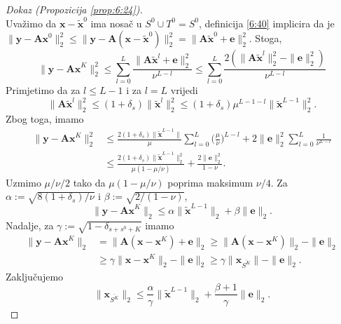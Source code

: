 \documentclass[a4paper,twoside,12pt]{memoir} %
\newcommand{\vect}[1]{\mathbf{#1}}
\renewcommand{\vec}{\vect}
\newcommand{\norm}[1]{\|{#1}\|}
\begin{document}
\begin{proof}[Dokaz (Propozicija \ref{prop:6:24})]
\begin{equation*}
    \end{equation*}
    \newpage
    \noindent
    Uva\v{z}imo da $\vec x - \tilde{\vec x}^0$ ima nosa\v{c} u $S^0 \cup T^0 = S^0$, definicija \eqref{6:40} implicira da je $\norm{\vec y - \vec {Ax}^0}_2^2 \leq \norm{\vec y - \vec A(\vec x - \tilde{\vec x}^0)}_2^2 = \norm{\vec A \tilde{\vec x}^0 + \vec e}_2^2$. Stoga,
    \begin{equation*}
        \norm{\vec y - \vec {Ax}^K}_2^2 \leq \sum_{l=0}^L \frac{\norm{\vec A \tilde{\vec x}^l + \vec e}_2^2}{\nu^{L-l}} \leq \sum_{l=0}^L \frac{2(\norm{\vec A \tilde{\vec x}^l}_2^2 - \norm{\vec e}_2^2)}{\nu^{L-l}}  
    \end{equation*}
    Primjetimo da za $l \leq L - 1$ i za $l = L$ vrijedi
    \begin{equation*}
        \norm{\vec A \tilde{\vec x}^l}_2^2 \leq (1+\delta_s)\norm{\tilde{\vec x}^l}_2^2 \leq (1+\delta_s)\mu^{L-1-l} \norm{\tilde{\vec x}^{L-1}}_2^2.
    \end{equation*}
    Zbog toga, imamo
    \begin{align*}
        \norm{\vec y - \vec{Ax}^K}_2^2 & \leq \frac{2(1+\delta_s)\norm{\tilde{\vec x}^{L-1}}}{\mu}\sum_{l=0}^L \bigg( \frac{\mu}{\nu} \bigg)^{L-l}+2 \norm{\vec e}_2^2 \sum_{l=0}^L \frac{1}{\nu^{L-l}}\\
        &\leq \frac{2(1+\delta_s)\norm{\tilde{\vec x}^{L-1}}_2^2}{\mu(1-\mu/\nu)}+ \frac{2\norm{\vec e}_2^2}{1-\nu}. 
    \end{align*}
    Uzmimo $\mu/\nu/2$ tako da $\mu(1-\mu/\nu)$ poprima maksimum $\nu/4$. Za $\alpha := \sqrt{8(1+\delta_s)/\nu}$ i $\beta := \sqrt{2/(1-\nu)}$,
    \begin{equation}\label{6:44}
        \norm{\vec y - \vec{Ax}^K}_2 \leq \alpha \norm{\tilde{\vec x}^{L-1}}_2 + \beta \norm{\vec e}_2.
    \end{equation}
    Nadalje, za $\gamma := \sqrt{1 - \delta_{s + s^0 + K}}$ imamo
    \begin{align*}
    \norm{\vec y - \vec{Ax}^K}_2 &= \norm{\vec A(\vec x - \vec x^K) + \vec e}_2 \geq \norm{\vec A(\vec x - \vec x^K)}_2 - \norm{\vec e}_2\\[0.5em]
        & \geq \gamma \norm{\vec x -  \vec x^K}_2 - \norm{\vec e}_2 \geq \gamma \norm{\vec x_{\overline{S^K}}} - \norm{\vec e}_2.
    \end{align*}
    Zaklju\v{c}ujemo
    \begin{equation}\label{6:45}
        \norm{\vec x_{\overline{S^K}}}_2 \leq \frac{\alpha}{\gamma} \norm{\tilde{\vec x}^{L-1}}_2 + \frac{\beta + 1}{\gamma} \norm{\vec e}_2.   

\end{equation}
\end{proof}
\end{document}
